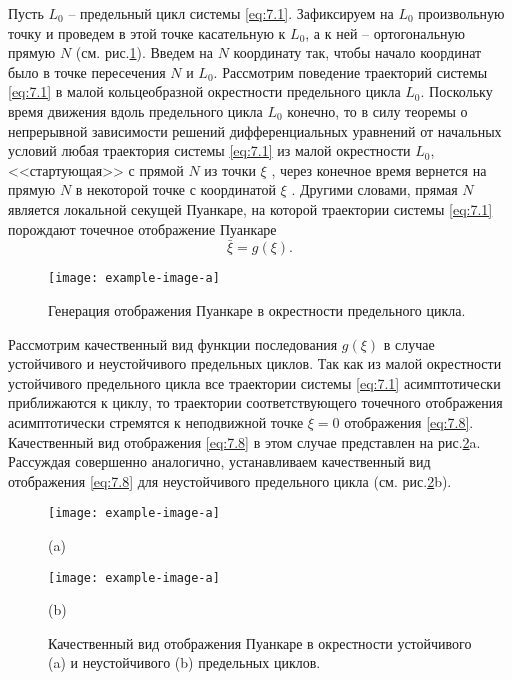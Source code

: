 Пусть $L_0$ -- предельный цикл системы \eqref{eq:7.1}. Зафиксируем на $L_0$ произвольную точку и проведем
в этой точке касательную к $L_0$, а к ней -- ортогональную прямую $N$ (см. рис.\ref{fig:7.3}). Введем на $N$ координату так, чтобы начало координат было в точке пересечения $N$ и $L_0$. Рассмотрим поведение траекторий системы \eqref{eq:7.1} в малой
кольцеобразной окрестности предельного цикла $L_0$. Поскольку время
движения вдоль предельного цикла $L_0$ конечно, то в силу теоремы о
непрерывной зависимости решений дифференциальных уравнений от
начальных условий любая траектория системы \eqref{eq:7.1} из малой окрестности  $L_0$,
<<стартующая>> с прямой $N$ из точки $\xi$ , через конечное время вернется на
прямую $N$ в некоторой точке с координатой $\xi$ . Другими словами, прямая $N$
является локальной секущей Пуанкаре, на которой траектории системы \eqref{eq:7.1}
порождают точечное отображение Пуанкаре
\begin{equation}
        \label{eq:7.8}
        \bar \xi = g(\xi).
\end{equation}
\begin{figure}[h]
        \centering
        \texttt{[image: example-image-a]}
        \caption{Генерация отображения Пуанкаре в окрестности предельного цикла.}
        \label{fig:7.3}
\end{figure}
Рассмотрим качественный вид функции последования $g( \xi)$ в случае устойчивого и неустойчивого предельных циклов. Так как из малой окрестности устойчивого предельного цикла все траектории системы
\eqref{eq:7.1} асимптотически приближаются к циклу, то траектории соответствующего точечного отображения асимптотически стремятся к неподвижной точке $\xi = 0$ отображения \eqref{eq:7.8}. Качественный вид отображения \eqref{eq:7.8} в этом случае представлен на рис.\ref{fig:7.4}a. Рассуждая совершенно аналогично, устанавливаем качественный вид отображения \eqref{eq:7.8} для неустойчивого предельного цикла (см. рис.\ref{fig:7.4}b).
\begin{figure}[h]
        \centering
        \begin{minipage}{0.49\linewidth}
                \centering
               \texttt{[image: example-image-a]} 

               (a)
        \end{minipage}
        \begin{minipage}{0.49\linewidth}
                \centering
               \texttt{[image: example-image-a]} 

               (b)
        \end{minipage}
        \caption{Качественный вид отображения Пуанкаре в окрестности устойчивого (a) и неустойчивого (b) предельных циклов.}
        \label{fig:7.4}
\end{figure}

